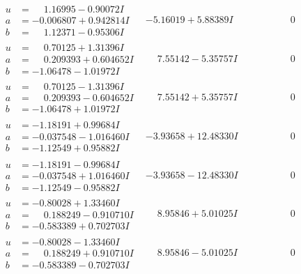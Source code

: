 \documentclass[1p]{elsarticle_modified}
\theoremstyle{definition}
\begin{document}
$$\begin{array}{c|c|c}
\begin{aligned}
u &= \phantom{-}1.16995 - 0.90072 I \\
a &= -0.006807 + 0.942814 I \\
b &= \phantom{-}1.12371 - 0.95306 I\end{aligned}
 & -5.16019 + 5.88389 I & \phantom{-0.000000 } 0 \\ \hline\begin{aligned}
u &= \phantom{-}0.70125 + 1.31396 I \\
a &= \phantom{-}0.209393 + 0.604652 I \\
b &= -1.06478 - 1.01972 I\end{aligned}
 & \phantom{-}7.55142 - 5.35757 I & \phantom{-0.000000 } 0 \\ \hline\begin{aligned}
u &= \phantom{-}0.70125 - 1.31396 I \\
a &= \phantom{-}0.209393 - 0.604652 I \\
b &= -1.06478 + 1.01972 I\end{aligned}
 & \phantom{-}7.55142 + 5.35757 I & \phantom{-0.000000 } 0 \\ \hline\begin{aligned}
u &= -1.18191 + 0.99684 I \\
a &= -0.037548 - 1.016460 I \\
b &= -1.12549 + 0.95882 I\end{aligned}
 & -3.93658 + 12.48330 I & \phantom{-0.000000 } 0 \\ \hline\begin{aligned}
u &= -1.18191 - 0.99684 I \\
a &= -0.037548 + 1.016460 I \\
b &= -1.12549 - 0.95882 I\end{aligned}
 & -3.93658 - 12.48330 I & \phantom{-0.000000 } 0 \\ \hline\begin{aligned}
u &= -0.80028 + 1.33460 I \\
a &= \phantom{-}0.188249 - 0.910710 I \\
b &= -0.583389 + 0.702703 I\end{aligned}
 & \phantom{-}8.95846 + 5.01025 I & \phantom{-0.000000 } 0 \\ \hline\begin{aligned}
u &= -0.80028 - 1.33460 I \\
a &= \phantom{-}0.188249 + 0.910710 I \\
b &= -0.583389 - 0.702703 I\end{aligned}
 & \phantom{-}8.95846 - 5.01025 I & \phantom{-0.000000 } 0 \\ \hline\begin{aligned}

\end{aligned}
\end{array}$$
\end{document}
